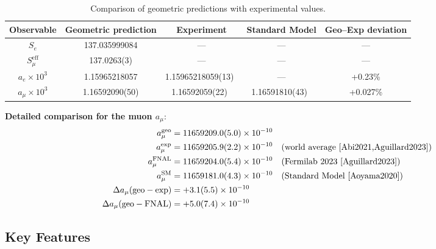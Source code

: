 \documentclass[aps,prd,reprint,nofootinbib]{revtex4-2}
\begin{document}
\begin{table}[h]
\caption{Comparison of geometric predictions with experimental values.}
\label{tab:results}
\begin{ruledtabular}
\begin{tabular}{c c c c c}
\hline
Observable & Geometric prediction & Experiment & Standard Model & Geo--Exp deviation \\
\hline
$S_e$ & 137.035999084 & --- & --- & --- \\
$S_\mu^{\text{eff}}$ & 137.0263(3) & --- & --- & --- \\
$a_e \times 10^3$ & 1.15965218057 & 1.15965218059(13)~\cite{Hanneke2008,Fan2023} & --- & +0.23\% \\
$a_\mu \times 10^3$ & 1.16592090(50) & 1.16592059(22)~\cite{Abi2021,Aguillard2023} & 1.16591810(43)~\cite{Aoyama2020} & +0.027\% \\
\hline
\end{tabular}
\end{ruledtabular}
\end{table}

\textbf{Detailed comparison for the muon $a_\mu$}:
\begin{align}
a_\mu^{\text{geo}} &= 11659209.0(5.0) \times 10^{-10} \\
a_\mu^{\text{exp}} &= 11659205.9(2.2) \times 10^{-10} \quad \text{(world average~\cite{Abi2021,Aguillard2023})} \\
a_\mu^{\text{FNAL}} &= 11659204.0(5.4) \times 10^{-10} \quad \text{(Fermilab 2023~\cite{Aguillard2023})} \\
a_\mu^{\text{SM}} &= 11659181.0(4.3) \times 10^{-10} \quad \text{(Standard Model~\cite{Aoyama2020})} \\
\Delta a_\mu(\text{geo}-\text{exp}) &= +3.1(5.5) \times 10^{-10} \\
\Delta a_\mu(\text{geo}-\text{FNAL}) &= +5.0(7.4) \times 10^{-10}
\end{align}

\subsection{Key Features}
\end{document}
